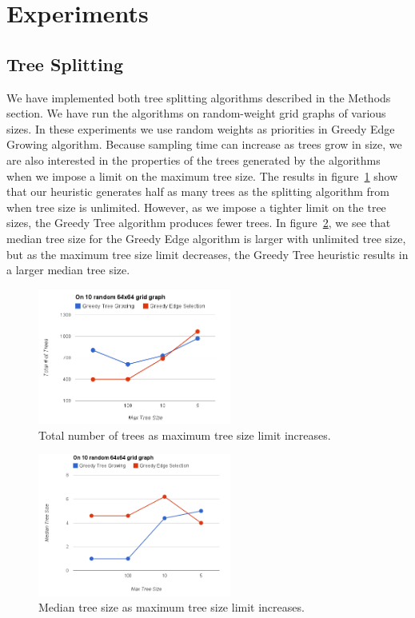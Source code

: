 \documentclass{article} %
\begin{document}
\section{Experiments}

\subsection{Tree Splitting}%

We have implemented both tree splitting algorithms described in the Methods
section.  We have run the algorithms on random-weight grid graphs of various
sizes.  In these experiments we use random weights as priorities in Greedy Edge
Growing algorithm. Because sampling time can increase as trees grow in size, we
are also interested in the properties of the trees generated by the algorithms
when we impose a limit on the maximum tree size.   The results in
figure~\ref{fig:treeResultsNumber} show that our heuristic generates half as
many trees as the splitting algorithm from~\cite{rivasseau2005jungle} when tree
size is unlimited. However, as we impose a tighter limit on the tree sizes, the
Greedy Tree algorithm produces fewer trees. In
figure~\ref{fig:treeResultsMedian}, we see that median tree size for the Greedy
Edge algorithm is larger with unlimited tree size, but as the maximum tree size
limit decreases, the Greedy Tree heuristic results in a larger median tree size.

 \begin{figure}
\begin{center}
   \includegraphics[width=2.5in]{figures/TotalTrees-Vs-MaxTreeSize} 
\caption[]{Total number of trees as maximum tree size limit increases.}
\label{fig:treeResultsNumber}
\end{center}
  \end{figure}

 \begin{figure}
\begin{center}
   \includegraphics[width=2.5in]{figures/MedianTreeSize-Vs-MaxTreeSize}
\caption[]{Median tree size as maximum tree size limit increases.}
\label{fig:treeResultsMedian}
\end{center}
\end{figure}
\end{document}
